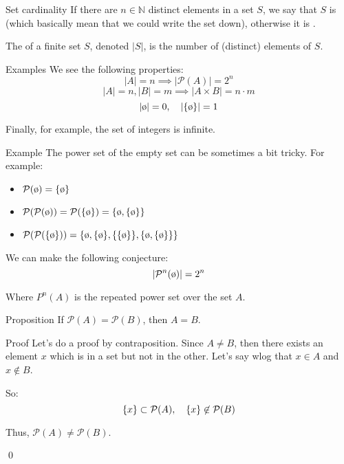 \documentclass[a4paper]{article}
\begin{document}
\begin{parag}{Set cardinality}
    If there are $n \in \mathbb{N}$ distinct elements in a set $S$, we say that $S$ is  (which basically mean that we could write the set down), otherwise it is .

    The  of a finite set $S$, denoted $\left|S\right|$, is the number of (distinct) elements of $S$.

    \begin{subparag}{Examples}
        We see the following properties:
        \[\left|A\right| = n \implies \left|\mathcal{P}\left(A\right)\right| = 2^n\]
        \[\left|A\right| = n, \left|B\right| = m \implies \left|A \times B\right| = n\cdot m\]
        \[\left|\o\right| = 0, \mathspace \left|\left\{\o\right\}\right| = 1\]

        Finally, for example, the set of integers is infinite.
    \end{subparag}
\end{parag}

\begin{parag}{Example}
    The power set of the empty set can be sometimes a bit tricky. For example:
    \begin{itemize}
        \item $\mathcal{P}\left(\o\right) = \left\{\o\right\}$
        \item $\mathcal{P}\left(\mathcal{P}\left(\o\right)\right) = \mathcal{P}\left(\left\{\o\right\}\right) = \left\{\o, \left\{\o\right\}\right\}$
        \item $\mathcal{P}\left(\mathcal{P}\left(\left\{\o\right\}\right)\right) = \left\{\o, \left\{\o\right\}, \left\{\left\{\o\right\}\right\}, \left\{\o, \left\{\o\right\}\right\}\right\}$
    \end{itemize}

    We can make the following conjecture:
    \[\left|\mathcal{P}^n \left(\o\right)\right| = 2^{n}\]

    Where $P^n\left(A\right)$ is the repeated power set over the set $A$.
\end{parag}

\begin{parag}{Proposition}
    If $\mathcal{P}\left(A\right) = \mathcal{P}\left(B\right)$, then $A = B$.

    \begin{subparag}{Proof}
        Let's do a proof by contraposition. Since $A \neq B$, then there exists an element $x$ which is in a set but not in the other. Let's say wlog that $x \in A$ and $x \not \in B$.

        So:
        \[\left\{x\right\} \subset \mathcal{P}\left(A\right), \mathspace \left\{x\right\} \not \in \mathcal{P}\left(B\right)\]

        Thus, $\mathcal{P}\left(A\right) \neq \mathcal{P}\left(B\right)$.

        \qed
    \end{subparag}
\end{parag}
\end{document}
